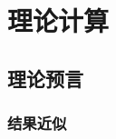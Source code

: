 \section{理论计算}%

\zhlipsum[2]

\subsection{理论预言}%

\zhlipsum[3]

\subsubsection{结果近似}%

\zhlipsum[4-5]


